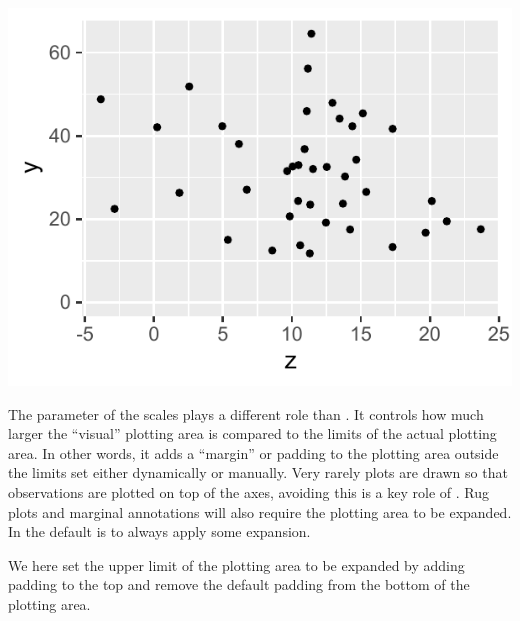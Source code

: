 \documentclass[krantz2]{krantz}\usepackage{knitr}
\begin{document}
\begin{knitrout}\footnotesize
{}\color{fgcolor}\begin{kframe}
\begin{alltt}
  \hlopt{+}
  \hlstd{()} \hlopt{+}
  \hlstd{(} \hlstd{=} \hlstd{,}  \hlstd{=} \hlstd{)}
\end{alltt}
\end{kframe}

{\centering \includegraphics[width=.54\textwidth]{figure/pos-scale-limits-04-1} 

}



\end{knitrout}

The  parameter of the scales plays a different role than . It controls how much larger the ``visual'' plotting area is compared to the limits of the actual plotting area. In other words, it adds a ``margin'' or padding to the plotting area outside the limits set either dynamically or manually. Very rarely plots are drawn so that observations are plotted on top of the axes, avoiding this is a key role of . Rug plots and marginal annotations will also require the plotting area to be expanded. In \ggplot the default is to always apply some expansion.

We here set the upper limit of the plotting area to be expanded by adding padding to the top and remove the default padding from the bottom of the plotting area.

\begin{knitrout}\footnotesize
{}\color{fgcolor}\begin{kframe}
\begin{alltt}
  \hlstd{(}      \hlopt{+}
  \hlstd{(} \hlstd{=} \hlstd{)} \hlopt{+}
  \hlstd{(} \hlstd{=} \hlstd{(} \hlstd{=} \hlstd{(}\hlstd{,} \hlstd{)))}
\end{alltt}
\end{kframe}
\end{knitrout}
\end{document}
